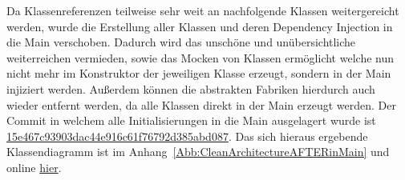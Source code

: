 Da Klassenreferenzen teilweise sehr weit an nachfolgende Klassen \glqq weitergereicht\grqq{} werden, wurde die Erstellung aller Klassen und deren Dependency Injection in die Main verschoben. Dadurch wird das unschöne und unübersichtliche weiterreichen vermieden, sowie das Mocken von Klassen ermöglicht welche nun nicht mehr im Konstruktor der jeweiligen Klasse erzeugt, sondern in der Main injiziert werden. Außerdem können die abstrakten Fabriken hierdurch auch wieder entfernt werden, da alle Klassen direkt in der Main erzeugt werden. Der Commit in welchem alle Initialisierungen in die Main ausgelagert wurde ist \href{https://github.com/EinToni/Wortfinder/commit/15e467c93903dac44e916c61f76792d385abd087}{15e467c93903dac44e916c61f76792d385abd087}. Das sich hieraus ergebende Klassendiagramm ist im Anhang~\ref{Abb:CleanArchitectureAFTERinMain} und online \href{https://github.com/EinToni/WortfinderDoku/blob/main/Bilder/CleanArchitectureAFTERinMain.png}{hier}.

\endinput